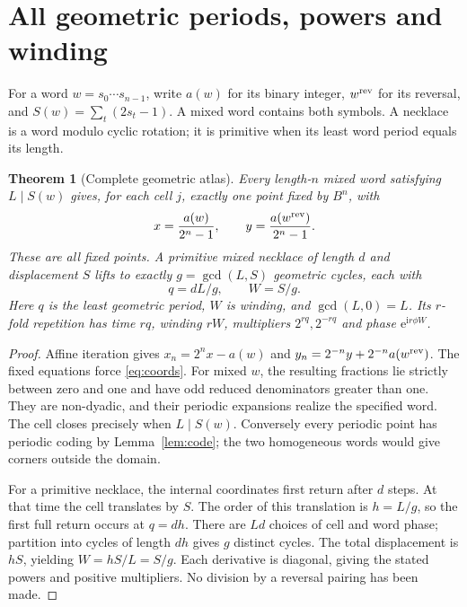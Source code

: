 \documentclass[10pt]{article}
\newtheorem{theorem}{Theorem}
\newcommand{\ii}{\mathrm i}
\newcommand{\ee}{\mathrm e}
\begin{document}
\section{All geometric periods, powers and winding}
For a word $w=s_0\cdots s_{n-1}$, write $a(w)$ for its binary integer,
$w^{\rm rev}$ for its reversal, and $S(w)=\sum_t(2s_t-1)$. A mixed word
contains both symbols. A necklace is a word modulo cyclic rotation; it is
primitive when its least word period equals its length.

\begin{theorem}[Complete geometric atlas]\label{thm:atlas}
Every length-$n$ mixed word satisfying $L\mid S(w)$ gives, for each cell $j$,
exactly one point fixed by $B^n$, with
\begin{equation}\label{eq:coords}
x=\frac{a(w)}{2^n-1},\qquad y=\frac{a(w^{\rm rev})}{2^n-1}.
\end{equation}
These are all fixed points. A primitive mixed necklace of length $d$ and
displacement $S$ lifts to exactly $g=\gcd(L,S)$ geometric cycles, each with
\begin{equation}\label{eq:lift}
q=dL/g,\qquad W=S/g.
\end{equation}
Here $q$ is the least geometric period, $W$ is winding, and
$\gcd(L,0)=L$. Its $r$-fold repetition has time $rq$, winding $rW$,
multipliers $2^{rq},2^{-rq}$ and phase $\ee^{\ii r\phi W}$.
\end{theorem}
\begin{proof}
Affine iteration gives $x_n=2^nx-a(w)$ and
$y_n=2^{-n}y+2^{-n}a(w^{\rm rev})$. The fixed equations force
\eqref{eq:coords}. For mixed $w$, the resulting fractions lie strictly
between zero and one and have odd reduced denominators greater than one.
They are non-dyadic, and their periodic expansions realize the specified
word. The cell closes precisely when $L\mid S(w)$. Conversely every periodic
point has periodic coding by Lemma~\ref{lem:code}; the two homogeneous words
would give corners outside the domain.

For a primitive necklace, the internal coordinates first return after $d$
steps. At that time the cell translates by $S$. The order of this
translation is $h=L/g$, so the first full return occurs at $q=dh$. There
are $Ld$ choices of cell and word phase; partition into cycles of length
$dh$ gives $g$ distinct cycles. The total displacement is $hS$, yielding
$W=hS/L=S/g$. Each derivative is diagonal, giving the stated powers and
positive multipliers. No division by a reversal pairing has been made.
\end{proof}
\end{document}
